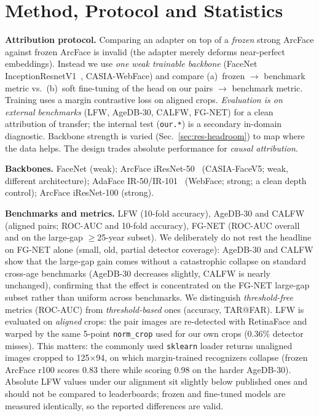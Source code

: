 \documentclass[journal]{IEEEtran}
\begin{document}
\section{Method, Protocol and Statistics}\label{sec:method}
\textbf{Attribution protocol.} Comparing an adapter on top of a \emph{frozen} strong ArcFace against frozen ArcFace is invalid (the adapter merely deforms near-perfect embeddings). Instead we use \emph{one weak trainable backbone} (FaceNet InceptionResnetV1~\cite{schroff2015facenet}, CASIA-WebFace) and compare (a)~frozen $\rightarrow$ benchmark metric vs.\ (b)~soft fine-tuning of the head on our pairs $\rightarrow$ benchmark metric. Training uses a margin contrastive loss on aligned crops. \emph{Evaluation is on external benchmarks} (LFW, AgeDB-30, CALFW, FG-NET) for a clean attribution of transfer; the internal test (\texttt{our.*}) is a secondary in-domain diagnostic. Backbone strength is varied (Sec.~\ref{sec:res-headroom}) to map where the data helps. The design trades absolute performance for \emph{causal attribution}.

\textbf{Backbones.} FaceNet (weak); ArcFace iResNet-50~\cite{deng2019arcface} (CASIA-FaceV5; weak, different architecture); AdaFace IR-50/IR-101~\cite{kim2022adaface} (WebFace; strong; a clean depth control); ArcFace iResNet-100 (strong).

\textbf{Benchmarks and metrics.} LFW (10-fold accuracy), AgeDB-30 and CALFW (aligned pairs; ROC-AUC and 10-fold accuracy), FG-NET (ROC-AUC overall and on the large-gap $\geq$25-year subset). We deliberately do not rest the headline on FG-NET alone (small, old, partial detector coverage): AgeDB-30 and CALFW show that the large-gap gain comes without a catastrophic collapse on standard cross-age benchmarks (AgeDB-30 decreases slightly, CALFW is nearly unchanged), confirming that the effect is concentrated on the FG-NET large-gap subset rather than uniform across benchmarks. We distinguish \emph{threshold-free} metrics (ROC-AUC) from \emph{threshold-based} ones (accuracy, TAR@FAR). LFW is evaluated on \emph{aligned} crops: the pair images are re-detected with RetinaFace and warped by the same 5-point \texttt{norm\_crop} used for our own crops (0.36\% detector misses). This matters: the commonly used \texttt{sklearn} loader returns unaligned images cropped to 125$\times$94, on which margin-trained recognizers collapse (frozen ArcFace r100 scores 0.83 there while scoring 0.98 on the harder AgeDB-30). Absolute LFW values under our alignment sit slightly below published ones and should not be compared to leaderboards; frozen and fine-tuned models are measured identically, so the reported differences are valid.
\end{document}
